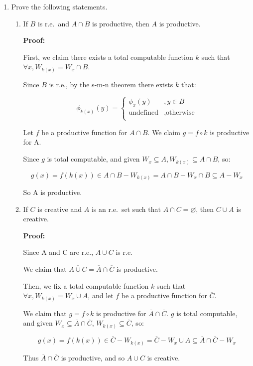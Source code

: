 \documentclass[12pt,a4paper]{article}
\theoremstyle{definition}
\numberwithin{equation}{section}
\numberwithin{figure}{section}
\begin{document}
\begin{enumerate}

\item Prove the following statements.
\begin{enumerate}
\item If $B$ is r.e.~and $A\cap B$ is productive, then $A$ is productive.

\textbf{Proof:}

First, we claim there exists a total computable function $k$ such that $ \forall x,W_{k(x)} = W_x \cap B$.

Since $B$ is r.e., by the s-m-n theorem there exists $k$ that:

$$\phi_{k(x)}(y) = \begin{cases} \phi_x(y) &, y \in B \\
 \mbox{undefined} &,\mbox{otherwise} \\
 \end{cases}
$$

Let $f$ be a productive function for $A \cap B$. We claim $g = f \circ k$ is productive for A.

Since $g$ is total computable, and given $W_x \subseteq A, W_{k(x)} \subseteq A \cap B$, so:

 $$g(x)= f (k(x)) \in A \cap B − W_{k(x)} = A \cap B − W_x \cap B \subseteq A − W_x$$
 
So A is productive.

\item If $C$ is creative and $A$ is an r.e.~set such that $A\cap C=\varnothing$, then $C\cup A$ is creative.

\textbf{Proof:}

Since A and C are r.e., $A \cup C$ is r.e.

We claim that $\overline{A \cup C} = \overline{A} \cap \overline{C}$ is productive. 

Then, we fix a total computable function $k$ such that $\forall x, W_{k(x)} = W_x \cup A$, and let $f$ be a productive function for $\overline{C}$.

We claim that $g = f \circ k$ is productive for $\overline{A} \cap \overline{C}$. $g$ is total computable, and given $W_x \subseteq \overline{A} \cap \overline{C}$, $W_{k(x)} \subseteq \overline{C}$, so:

$$g(x) = f(k(x)) \in \overline{C} - W_{k (x )} = \overline{C} - W_x \cup A \subseteq \overline{A} \cap \overline{C} - W_x$$

Thus $\overline{A} \cap \overline{C}$ is productive, and so $A \cup C$ is creative.


\end{enumerate}
\end{enumerate}
\end{document}

